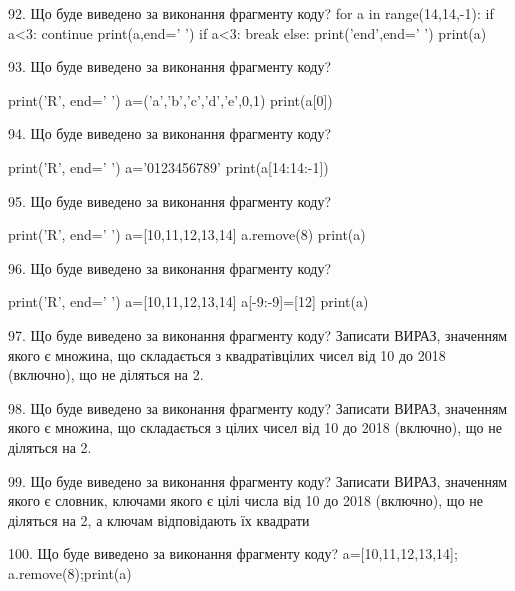 \documentclass[11pt]{article}
\begin{document}

92. Що буде виведено за виконання фрагменту коду?
for a in range(14,14,-1):
    if a<3:
        continue
        print(a,end=' ')
    if a<3:
        break
    else:
        print('end',end=' ')
    print(a)


93. Що буде виведено за виконання фрагменту коду?

print('R', end=' ')
a=('a','b','c','d','e',0,1)
print(a[0])



94. Що буде виведено за виконання фрагменту коду?

print('R', end=' ')
a='0123456789'
print(a[14:14:-1])



95. Що буде виведено за виконання фрагменту коду?

print('R', end=' ')
a=[10,11,12,13,14]
a.remove(8)
print(a)



96. Що буде виведено за виконання фрагменту коду?

print('R', end=' ')
a=[10,11,12,13,14]
a[-9:-9]=[12]
print(a)



97. Що буде виведено за виконання фрагменту коду?
Записати ВИРАЗ, значенням якого є множина, що складається з квадратівцілих чисел від 10 до 2018 (включно), що не діляться на 2.

98. Що буде виведено за виконання фрагменту коду?
Записати ВИРАЗ, значенням якого є множина, що складається з цілих чисел від 10 до 2018 (включно), що не діляться на 2.

99. Що буде виведено за виконання фрагменту коду?
Записати ВИРАЗ, значенням якого є словник, ключами якого є цілі числа від 10 до 2018 (включно), що не діляться на 2, а ключам відповідають їх квадрати 

100. Що буде виведено за виконання фрагменту коду?
a=[10,11,12,13,14]; a.remove(8);print(a)

\newpage
\end{document}
